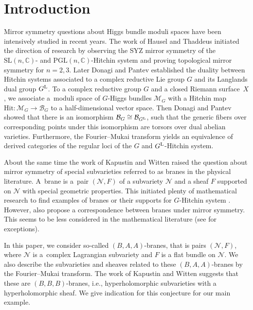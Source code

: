 \documentclass[pdftex]{sigma}
\numberwithin{equation}{section}
\theoremstyle{definition}
\renewcommand{\to}{\rightarrow}
\newcommand{\calB}{\mathcal{B}}
\newcommand{\calM}{\mathcal{M}}
\newcommand{\calN}{\mathcal{N}}
\newcommand{\CC}{\mathbb{C}}
\newcommand{\Hit}{\mathrm{Hit}}
\newcommand{\SL}{\mathrm{SL}}
\newcommand{\PGL}{\mathrm{PGL}}
\begin{document}
\section{Introduction}
Mirror symmetry questions about Higgs bundle moduli spaces have been intensively studied in recent years. The work of Hausel and Thaddeus \cite{HauselThaddeus} initiated the direction of research by observing the SYZ mirror symmetry of the $\SL(n,\CC)$- and $\PGL(n,\CC)$-Hitchin system and proving topological mirror symmetry for $n=2,3$. Later Donagi and Pantev \cite{DonagiPantev} established the duality between Hitchin systems associated to a complex reductive Lie group $G$ and its Langlands dual group $G^{\rm L}$. To a complex reductive group $G$ and a closed Riemann surface~$X$, we associate a~moduli space of $G$-Higgs bundles $\calM_G$ with a Hitchin map $\Hit\colon \calM_G \to \calB_G$ to a half-dimensional vector space. Then Donagi and Pantev showed that there is an isomorphism $\calB_G \cong \calB_{G^{\rm L}}$, such that the generic fibers over corresponding points under this isomorphism are torsors over dual abelian varieties. Furthermore, the Fourier--Mukai transform yields an equivalence of derived categories of the regular loci of the $G$ and $G^{\rm L}$-Hitchin system.

About the same time the work of Kapustin and Witten \cite{KapustinWitten} raised the question about mirror symmetry of special subvarieties referred to as branes in the physical literature. A~brane is a~pair $(\calN,F)$ of a subvariety $\calN$ and a sheaf $F$ supported on $\calN$ with special geometric properties. This initiated plenty of mathematical research to find examples of branes or their supports for $G$\nobreakdash-Hitchin system \cite{BaragliaSchaposnik1,BaragliaSchaposnik2, FrancoJardim, FrancoPeon, HauselHitchin, HellerSchaposnik, HitchinSpUmm, HitchinSpinors}. However, \cite{KapustinWitten} also propose a correspondence between branes under mirror symmetry. This seems to be less considered in the mathematical literature (see \cite{FrancoJardim, FrancoPeon, HauselHitchin, HitchinSpUmm} for exceptions).

In this paper, we consider so-called $(B,A,A)$-branes, that is pairs $(\calN,F)$, where $\calN$ is a~complex Lagrangian subvariety and $F$ is a flat bundle on $\calN$. We also describe the subvarieties and sheaves related to these $(B,A,A)$-branes by the Fourier--Mukai transform. The work of Kapustin and Witten \cite{KapustinWitten} suggests that these are $(B,B,B)$-branes, i.e., hyperholomorphic subvarieties with a hyperholomorphic sheaf. We give indication for this conjecture for our main example.
\end{document}
